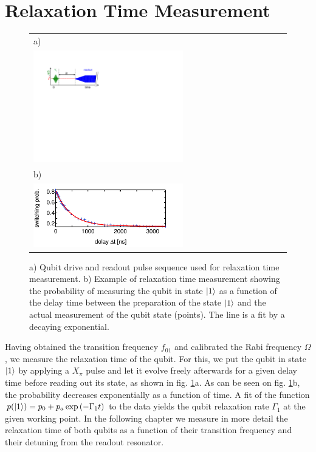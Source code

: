 \section{Relaxation Time Measurement}

\begin{figure}[ht!]
\begin{center}
\begin{tabular}{l}
a) \\ \includegraphics[width=0.6\textwidth]{"./material/figures/measurement/qubit_t1_measurement"} \\
b) \\ \includegraphics[width=0.6\textwidth]{"./data/ct5/2011_04_21 - grover and tomo/example - qubit 2 t1"} \\
\end{tabular}
\end{center}
\caption[]{a) Qubit drive and readout pulse sequence used for relaxation time measurement. b) Example of relaxation time measurement showing the probability of measuring the qubit in state $\left| 1 \right>$ as a function of the delay time between the preparation of the state $\left| 1 \right>$ and the actual measurement of the qubit state (points). The line is a fit by a decaying exponential.}
\label{fig:qubit_t1_example}
\end{figure}

Having obtained the transition frequency $f_{01}$ and calibrated the Rabi frequency $\Omega$, we measure the relaxation time of the qubit. For this, we put the qubit in state $\left| 1 \right>$ by applying a $X_{\pi}$ pulse and let it evolve freely afterwards for a given delay time before reading out its state, as shown in fig. \ref{fig:qubit_t1_example}a. As can be seen on fig. \ref{fig:qubit_t1_example}b, the probability decreases exponentially as a function of time. A fit of the function $p(\left| 1 \right>) = p_0+p_a\exp{(-\Gamma_1 t)}$ to the data yields the qubit relaxation rate $\Gamma_1$ at the given working point. In the following chapter we measure in more detail the relaxation time of both qubits as a function of their transition frequency and their detuning from the readout resonator.

